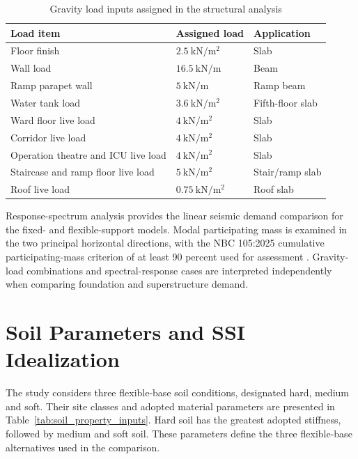 \begin{table}[htbp]
\fontsize{11}{13}\selectfont\setlength{\tabcolsep}{4pt}
\centering
\caption{Gravity load inputs assigned in the structural analysis}
\label{tab:gravity_load_inputs}
\renewcommand{\arraystretch}{1.0}
\begin{tabular}{@{}>{\centering\arraybackslash}p{5.5cm}>{\centering\arraybackslash}p{4cm}>{\centering\arraybackslash}p{\dimexpr\linewidth-9.5cm-16pt\relax}@{}}
\toprule
Load item & Assigned load & Application \\
\midrule
Floor finish & $2.5\ \mathrm{kN/m^{2}}$ & Slab \\
Wall load & $16.5\ \mathrm{kN/m}$ & Beam \\
Ramp parapet wall & $5\ \mathrm{kN/m}$ & Ramp beam \\
Water tank load & $3.6\ \mathrm{kN/m^{2}}$ & Fifth-floor slab \\
Ward floor live load & $4\ \mathrm{kN/m^{2}}$ & Slab \\
Corridor live load & $4\ \mathrm{kN/m^{2}}$ & Slab \\
Operation theatre and ICU live load & $4\ \mathrm{kN/m^{2}}$ & Slab \\
Staircase and ramp floor live load & $5\ \mathrm{kN/m^{2}}$ & Stair/ramp slab \\
Roof live load & $0.75\ \mathrm{kN/m^{2}}$ & Roof slab \\
\bottomrule
\end{tabular}
\end{table}
\FloatBarrier

Response-spectrum analysis provides the linear seismic demand comparison for the fixed- and flexible-support models. Modal participating mass is examined in the two principal horizontal directions, with the NBC 105:2025 cumulative participating-mass criterion of at least 90 percent used for assessment \cite{nbc1052025}. Gravity-load combinations and spectral-response cases are interpreted independently when comparing foundation and superstructure demand.

\section{Soil Parameters and SSI Idealization}
The study considers three flexible-base soil conditions, designated hard, medium and soft. Their site classes and adopted material parameters are presented in Table~\ref{tab:soil_property_inputs}. Hard soil has the greatest adopted stiffness, followed by medium and soft soil. These parameters define the three flexible-base alternatives used in the comparison.

